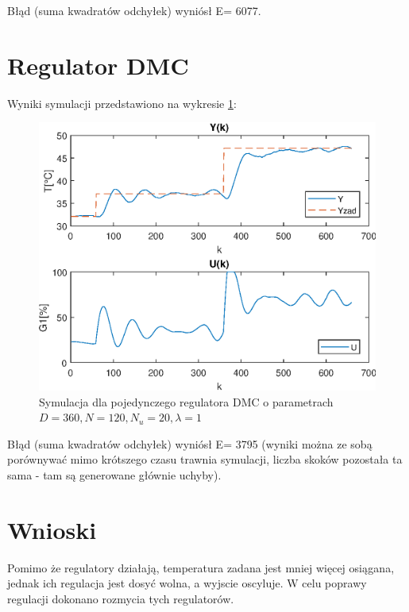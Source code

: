 Błąd (suma kwadratów odchyłek) wyniósł E= \num{6077}.

\FloatBarrier

\section{Regulator DMC}

Wyniki symulacji przedstawiono na wykresie \ref{naiwnyDMC}:

\begin{figure}[h!]
	\centering
	\includegraphics[scale=1]{Rys/NaiwnyDMC.eps}
	\caption{Symulacja dla pojedynczego regulatora DMC o parametrach $D=360, N=120, N_{u}=20, \lambda=1 $}
	\label{naiwnyDMC}
\end{figure}

Błąd (suma kwadratów odchyłek) wyniósł E= \num{3795} (wyniki można ze sobą porównywać mimo krótszego czasu trawnia symulacji, liczba skoków pozostała ta sama - tam są generowane głównie uchyby).

\section{Wnioski}

Pomimo że regulatory działają, temperatura zadana jest mniej więcej osiągana, jednak ich regulacja jest dosyć wolna, a wyjscie oscyluje. W celu poprawy regulacji dokonano rozmycia tych regulatorów.